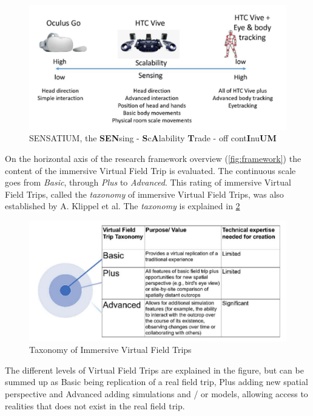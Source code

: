         \FloatBarrier
        \begin{figure}[!ht]
            \centering
            \includegraphics[width=0.7\linewidth]{figures/framework_technology_3.PNG}
            \caption{SENSATIUM, the \textbf{SEN}sing - \textbf{S}c\textbf{A}lability \textbf{T}rade - off cont\textbf{I}nu\textbf{UM}}
            \label{fig:sensatium}
        \end{figure}
        \FloatBarrier
        
        On the horizontal axis of the research framework overview (\cref{fig:framework}) the content of the immersive Virtual Field Trip is evaluated. The continuous scale goes from \emph{Basic}, through \emph{Plus} to \emph{Advanced}. This rating of immersive Virtual Field Trips, called the \emph{taxonomy} of immersive Virtual Field Trips, was also established by A. Klippel et al. The \emph{taxonomy} is explained in \cref{fig:taxonomy}
        
        \FloatBarrier
        \begin{figure}[!ht]
            \centering
            \includegraphics[width=0.7\linewidth]{figures/framework_content_3.PNG}
            \caption{Taxonomy of Immersive Virtual Field Trips}
            \label{fig:taxonomy}
        \end{figure}
        \FloatBarrier
        
        The different levels of Virtual Field Trips are explained in the figure, but can be summed up as Basic being replication of a real field trip, Plus adding new spatial perspective and Advanced adding simulations and / or models, allowing access to realities that does not exist in the real field trip.
        
